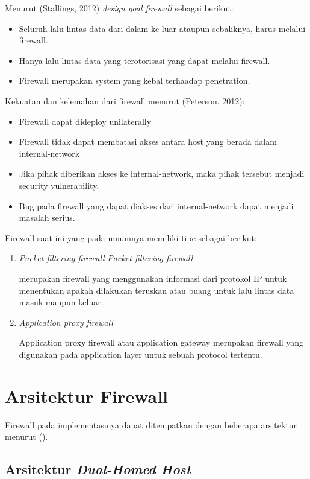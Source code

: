 Menurut (Stallings, 2012) \textit{design goal firewall} sebagai berikut:
\begin{itemize}
	\item Seluruh lalu lintas data dari dalam ke luar ataupun sebaliknya, harus melalui
	firewall.
	\item Hanya lalu lintas data yang terotorisasi yang dapat melalui firewall.
	\item Firewall merupakan system yang kebal terhaadap penetration.
\end{itemize}

Kekuatan dan kelemahan dari firewall menurut (Peterson, 2012):
\begin{itemize}
	\item Firewall dapat dideploy unilaterally
	\item Firewall tidak dapat membatasi akses antara host yang berada dalam internal-network
	\item Jika pihak diberikan akses ke internal-network, maka pihak tersebut
	menjadi security vulnerability.
	\item Bug pada firewall yang dapat diakses dari internal-network dapat menjadi masalah serius.
\end{itemize}

Firewall saat ini yang pada umumnya memiliki tipe sebagai berikut:

\begin{enumerate}
	\item \textit{Packet filtering firewall}
	\textit{Packet filtering firewall}
	
	merupakan firewall yang menggunakan informasi dari protokol IP untuk menentukan apakah dilakukan teruskan atau buang untuk lalu lintas data masuk maupun keluar.
	
	\item \textit{Application proxy firewall}
	
	Application proxy firewall atau application gateway merupakan firewall yang digunakan pada application layer untuk sebuah protocol tertentu.
	
\end{enumerate}

\section{Arsitektur Firewall}
Firewall pada implementasinya dapat ditempatkan dengan beberapa arsitektur menurut (\cite{zwicky2000building}).

\subsection{Arsitektur \textit{Dual-Homed Host}}

